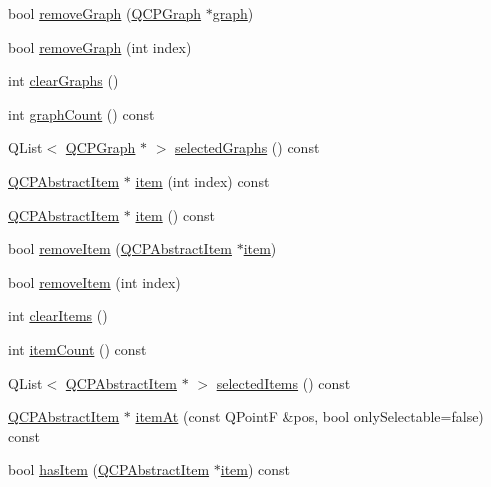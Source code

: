 \begin{DoxyCompactItemize}
\item 
bool \hyperlink{class_q_custom_plot_a903561be895fb6528a770d66ac5e6713}{remove\+Graph} (\hyperlink{class_q_c_p_graph}{Q\+C\+P\+Graph} $\ast$\hyperlink{class_q_custom_plot_a6d3ed93c2bf46ab7fa670d66be4cddaf}{graph})
\item 
bool \hyperlink{class_q_custom_plot_a9554b3d2d5b10c0f884bd4010b6c192c}{remove\+Graph} (int index)
\item 
int \hyperlink{class_q_custom_plot_ab0f3abff2d2f7df3668b5836f39207fa}{clear\+Graphs} ()
\item 
int \hyperlink{class_q_custom_plot_a7d9b4d19114b2fde60f0233eeb0aa682}{graph\+Count} () const 
\item 
Q\+List$<$ \hyperlink{class_q_c_p_graph}{Q\+C\+P\+Graph} $\ast$ $>$ \hyperlink{class_q_custom_plot_ad2a0493bdd01e7aa99a4209ae3a5b67b}{selected\+Graphs} () const 
\item 
\hyperlink{class_q_c_p_abstract_item}{Q\+C\+P\+Abstract\+Item} $\ast$ \hyperlink{class_q_custom_plot_a3e842b5a65b1d17fbb96cfb1fa1314d1}{item} (int index) const 
\item 
\hyperlink{class_q_c_p_abstract_item}{Q\+C\+P\+Abstract\+Item} $\ast$ \hyperlink{class_q_custom_plot_a700399eae539798c5baf64a37c7f2135}{item} () const 
\item 
bool \hyperlink{class_q_custom_plot_ae04446557292551e8fb6e2c106e1848d}{remove\+Item} (\hyperlink{class_q_c_p_abstract_item}{Q\+C\+P\+Abstract\+Item} $\ast$\hyperlink{class_q_custom_plot_a3e842b5a65b1d17fbb96cfb1fa1314d1}{item})
\item 
bool \hyperlink{class_q_custom_plot_abcfdda3d601c0441cab136137d715dea}{remove\+Item} (int index)
\item 
int \hyperlink{class_q_custom_plot_abdfd07d4f0591d0cf967f85013fd3645}{clear\+Items} ()
\item 
int \hyperlink{class_q_custom_plot_a6fc860e30df17fd5c46056bf6fe29390}{item\+Count} () const 
\item 
Q\+List$<$ \hyperlink{class_q_c_p_abstract_item}{Q\+C\+P\+Abstract\+Item} $\ast$ $>$ \hyperlink{class_q_custom_plot_a1a48b13547e2d9ac5cd6927516f47a2e}{selected\+Items} () const 
\item 
\hyperlink{class_q_c_p_abstract_item}{Q\+C\+P\+Abstract\+Item} $\ast$ \hyperlink{class_q_custom_plot_a793e4b04e0ede11a733021907368fa83}{item\+At} (const Q\+PointF \&pos, bool only\+Selectable=false) const 
\item 
bool \hyperlink{class_q_custom_plot_ab4199c38b03e63a2623c82453fe8add5}{has\+Item} (\hyperlink{class_q_c_p_abstract_item}{Q\+C\+P\+Abstract\+Item} $\ast$\hyperlink{class_q_custom_plot_a3e842b5a65b1d17fbb96cfb1fa1314d1}{item}) const 

\end{DoxyCompactItemize}
